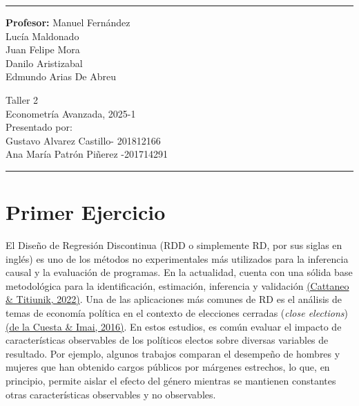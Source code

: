 \documentclass[a4paper, answers, addpoints, 11pt]{exam}
\begin{document}

\fancyhead[C]{}
\hrule \medskip 
\begin{minipage}{0.295\textwidth} 
\raggedright
\textbf{Profesor:} Manuel Fernández\\
\vspace{2mm}
Lucía Maldonado \\
Juan Felipe Mora \\
Danilo Aristizabal \\
Edmundo Arias De Abreu



\end{minipage}
\begin{minipage}{0.4\textwidth} 
\centering 
\huge 
Taller 2\\ 
\vspace{2mm}
\normalsize 
Econometría Avanzada, 2025-1\\ 
\vspace{2mm}
Presentado por: \\Gustavo Alvarez Castillo- 201812166\\
Ana María Patrón Piñerez -201714291

\end{minipage}

\medskip\hrule 
\bigskip
\section*{Primer Ejercicio}

El Diseño de Regresión Discontinua (RDD o simplemente RD, por sus siglas en inglés) es uno de los métodos no experimentales más utilizados para la inferencia causal y la evaluación de programas. En la actualidad, cuenta con una sólida base metodológica para la identificación, estimación, inferencia y validación \href{https://arxiv.org/abs/2108.09400}{(Cattaneo \& Titiunik, 2022)}. Una de las aplicaciones más comunes de RD es el análisis de temas de economía política en el contexto de elecciones cerradas (\textit{close elections}) \href{https://www.annualreviews.org/content/journals/10.1146/annurev-polisci-032015-010115}{(de la Cuesta \& Imai, 2016)}. En estos estudios, es común evaluar el impacto de características observables de los políticos electos sobre diversas variables de resultado. Por ejemplo, algunos trabajos comparan el desempeño de hombres y mujeres que han obtenido cargos públicos por márgenes estrechos, lo que, en principio, permite aislar el efecto del género mientras se mantienen constantes otras características observables y no observables. \\
\end{document}
